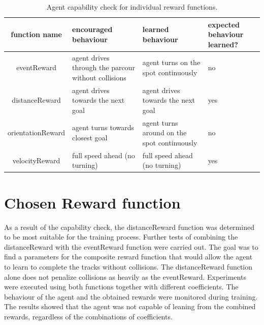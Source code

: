 \begin{table}
    \begin{center}
        \begin{tabular}{|| c | p{} | p{} | p{} ||}
            \hline
            function name     & encouraged behaviour                                & learned behaviour                           & expected behaviour learned? \\ [0.5ex]
            \hline\hline
            eventReward       & agent drives through the parcour without collisions & agent turns on the spot continuously        & no                          \\
            \hline
            distanceReward    & agent drives towards the next goal                  & agent drives towards the next goal          & yes                         \\
            \hline
            orientationReward & agent turns towards closest goal                    & agent turns around on the spot continuously & no                          \\
            \hline
            velocityReward    & full speed ahead (no turning)                       & full speed ahead (no turning)               & yes                         \\
            \hline
        \end{tabular}
    \end{center}
    \caption{Agent capability check for individual reward functions.}
    \label{table:reward_functions_behaviour}
\end{table}


\section{Chosen Reward function}

As a result of the capability check, the distanceReward function was determined to be most suitable for the training process. Further tests of combining the distanceReward with the eventReward function were carried out. The goal was to find a parameters for the composite reward function that would allow the agent to learn to complete the tracks without collisions. The distanceReward function alone does not penalize collisions as heavily as the eventReward.
Experiments were executed using both functions together with different coefficients. The behaviour of the agent and the obtained rewards were monitored during training. The results showed that the agent was not capable of leaning from the combined rewards, regardless of the combinations of coefficients.

